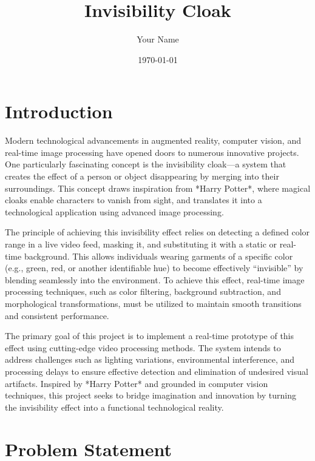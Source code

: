 \documentclass[onecolumn]{article} %
\begin{document}
\title{\textbf{Invisibility Cloak}}
\author{Your Name}
\date{\today} %
\maketitle


\section{Introduction}

Modern technological advancements in augmented reality, computer vision, and real-time image processing have opened doors to numerous innovative projects. One particularly fascinating concept is the invisibility cloak—a system that creates the effect of a person or object disappearing by merging into their surroundings. This concept draws inspiration from *Harry Potter*, where magical cloaks enable characters to vanish from sight, and translates it into a technological application using advanced image processing.

The principle of achieving this invisibility effect relies on detecting a defined color range in a live video feed, masking it, and substituting it with a static or real-time background. This allows individuals wearing garments of a specific color (e.g., green, red, or another identifiable hue) to become effectively “invisible” by blending seamlessly into the environment. To achieve this effect, real-time image processing techniques, such as color filtering, background subtraction, and morphological transformations, must be utilized to maintain smooth transitions and consistent performance.

The primary goal of this project is to implement a real-time prototype of this effect using cutting-edge video processing methods. The system intends to address challenges such as lighting variations, environmental interference, and processing delays to ensure effective detection and elimination of undesired visual artifacts. Inspired by *Harry Potter* and grounded in computer vision techniques, this project seeks to bridge imagination and innovation by turning the invisibility effect into a functional technological reality.

\vspace{0.5cm}

\section{Problem Statement}
\end{document}
